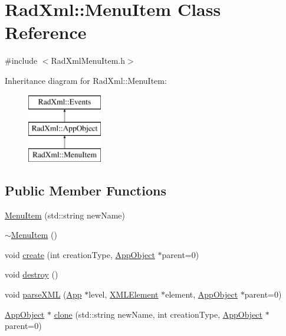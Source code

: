 \hypertarget{class_rad_xml_1_1_menu_item}{\section{Rad\-Xml\-:\-:Menu\-Item Class Reference}
\label{class_rad_xml_1_1_menu_item}
}


{\ttfamily \#include $<$Rad\-Xml\-Menu\-Item.\-h$>$}

Inheritance diagram for Rad\-Xml\-:\-:Menu\-Item\-:\begin{figure}[H]
\begin{center}
\leavevmode
\includegraphics[height=3.000000cm]{class_rad_xml_1_1_menu_item}
\end{center}
\end{figure}
\subsection*{Public Member Functions}
\begin{DoxyCompactItemize}
\item 
\hyperlink{class_rad_xml_1_1_menu_item_ada09d8e5c7c6200ec9287ec4757b197d}{Menu\-Item} (std\-::string new\-Name)
\item 
\hyperlink{class_rad_xml_1_1_menu_item_ae1b3a1f1c10bba528feaed2da04d4a57}{$\sim$\-Menu\-Item} ()
\item 
void \hyperlink{class_rad_xml_1_1_menu_item_a402f02c95c766a5e3b276892fe48411a}{create} (int creation\-Type, \hyperlink{class_rad_xml_1_1_app_object}{App\-Object} $\ast$parent=0)
\item 
void \hyperlink{class_rad_xml_1_1_menu_item_ae129d5931815eb3091736b17a950aa84}{destroy} ()
\item 
void \hyperlink{class_rad_xml_1_1_menu_item_a5c0fa21e5f03d8d12daa99d4667af522}{parse\-X\-M\-L} (\hyperlink{class_rad_xml_1_1_app}{App} $\ast$level, \hyperlink{class_x_m_l_element}{X\-M\-L\-Element} $\ast$element, \hyperlink{class_rad_xml_1_1_app_object}{App\-Object} $\ast$parent=0)
\item 
\hyperlink{class_rad_xml_1_1_app_object}{App\-Object} $\ast$ \hyperlink{class_rad_xml_1_1_menu_item_ab53f773d3d9dc50441032f9738811262}{clone} (std\-::string new\-Name, int creation\-Type, \hyperlink{class_rad_xml_1_1_app_object}{App\-Object} $\ast$parent=0)
\end{DoxyCompactItemize}
